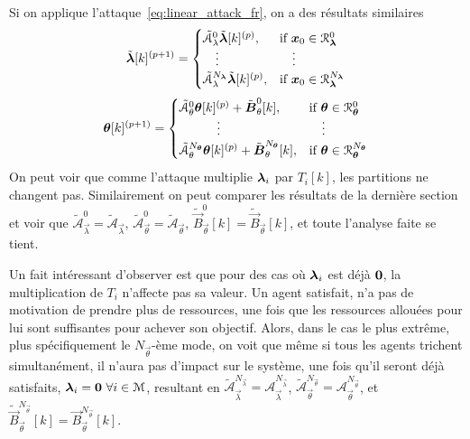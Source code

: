 \documentclass[../main.tex]{subfiles}
\begin{document}
Si on applique l'attaque~\eqref{eq:linear_attack_fr}, on a des résultats similaires
\begin{equation}
  \label{eq:negotiation_equation_substituting_organizing_matrix_lambda_switched_cheating_fr}
  \tilde{\vec{\lambda}}[k]\pplusone=
  \begin{cases}
    \tilde{\mathcal{A}}_{\lambda}^{0}\tilde{\vec{\lambda}}[k]\p,&\text{if}\ \vec{x}_{0}\in\set{R}_{\vec{\lambda}}^{0}\\
    \quad\vdots&\quad\vdots\\
    \tilde{\mathcal{A}}_{\lambda}^{N_{\vec{\lambda}}}\tilde{\vec{\lambda}}[k]\p,&\text{if}\ \vec{x}_{0}\in\set{R}_{\vec{\lambda}}^{N_{\vec{\lambda}}}\\
  \end{cases}
\end{equation}
\begin{equation}
  \label{eq:negotiation_equation_substituting_organizing_matrix_theta_switched_cheating_fr}
  \vec{\theta}[k]\pplusone=
  \begin{cases}
    \tilde{\mathcal{A}}_{\theta}^{0}\vec{\theta}[k]\p+\mathcal{\tilde{\vec{B}}}_{\theta}^{0}[k],&\text{if}\ \vec{\theta}\in\set{R}_{\vec{\theta}}^{0}\\
    \qquad\quad \vdots&\quad \vdots\\
    \tilde{\mathcal{A}}_{\theta}^{N_{\vec{\theta}}}\vec{\theta}[k]\p+\mathcal{\tilde{\vec{B}}}_{\theta}^{N_{\vec{\theta}}}[k],&\text{if}\ \vec{\theta}\in\set{R}_{\vec{\theta}}^{N_{\vec{\theta}}}\\
  \end{cases}
\end{equation}
On peut voir que comme l'attaque multiplie $\boldsymbol{\lambda}_{i}$ par $T_{i}[k]$, les partitions ne changent pas.
Similairement on peut comparer les résultats de la dernière section et voir que
$\tilde{\mathcal{A}}_{\vec{\lambda}}^{0}=\tilde{\mathcal{A}}_{\vec{\lambda}}$,
$\tilde{\mathcal{A}}_{\vec{\theta}}^{0}=\tilde{\mathcal{A}}_{\vec{\theta}}$,
$\tilde{\vec{B}}_{\vec{\theta}}^{0}[k]=\tilde{\vec{B}}_{\vec{\theta}}[k]$, et toute l'analyse faite se tient.

\begin{remark}\label{rem:cheat_satisfied_problem}
  Un fait intéressant d'observer est que pour des cas où $\boldsymbol{\lambda}_{i}$ est déjà $\mathbf{0}$, la multiplication de $T_{i}$ n'affecte pas sa valeur.
  Un agent satisfait, n'a pas de motivation de prendre plus de ressources, une fois que les ressources allouées pour lui sont suffisantes pour achever son objectif.
  Alors, dans le cas le plus extrême, plus spécifiquement le $N_{\vec{\theta}}$-ème mode, on voit que même si tous les agents trichent simultanément, il n'aura pas d'impact sur le système, une fois qu'il seront déjà satisfaits, $\boldsymbol{\lambda}_{i}=\mathbf{0}\ \forall i \in \mathcal{M}$, resultant en
  $\tilde{\mathcal{A}}_{\vec{\lambda}}^{N_{\vec{\lambda}}}=\mathcal{A}_{\vec{\lambda}}^{N_{\vec{\lambda}}}$,
  $\tilde{\mathcal{A}}_{\vec{\theta}}^{N_{\vec{\theta}}}=\mathcal{A}_{\vec{\theta}}^{N_{\vec{\theta}}}$, et
  $\tilde{\vec{B}}_{\vec{\theta}}^{N_{\vec{\theta}}}[k]=\vec{B}_{\vec{\theta}}^{N_{\vec{\theta}}}[k]$.
\end{remark}
\end{document}
